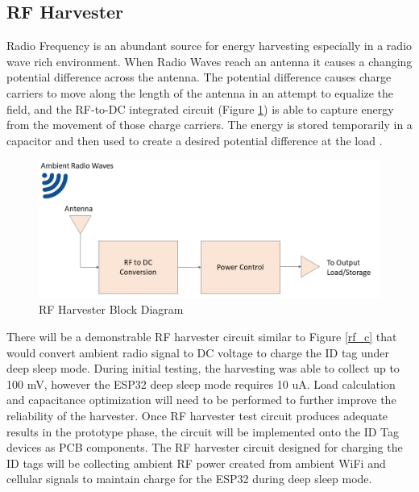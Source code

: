 \pagebreak
\subsection{RF Harvester}
\medskip
Radio Frequency is an abundant source for energy harvesting especially in a radio wave rich environment. When Radio Waves reach an antenna it causes a changing potential difference across the antenna. The potential difference causes charge carriers to move along the length of the antenna in an attempt to equalize the field, and the RF-to-DC integrated circuit (Figure \ref{rf_bd}) is able to capture energy from the movement of those charge carriers. The energy is stored temporarily in a capacitor and then used to create a desired potential difference at the load \cite{R5-2-1}.

\medskip
\begin{figure}[H]
\centering
    \includegraphics[scale=0.55]{./images/RF_H.png}
    \caption{RF Harvester Block Diagram}
    \label{rf_bd}
\end{figure}

There will be a demonstrable RF harvester circuit similar to Figure \ref{rf_c} that would convert ambient radio signal to DC voltage to charge the ID tag under deep sleep mode. During initial testing, the harvesting was able to collect up to 100 mV, however the ESP32 deep sleep mode requires 10 uA. Load calculation and capacitance optimization will need to be performed to further improve the reliability of the harvester. Once RF harvester test circuit produces adequate results in the prototype phase, the circuit will be implemented onto the ID Tag devices as PCB components. The RF harvester circuit designed for charging the ID tags will be collecting ambient RF power created from ambient WiFi and cellular signals to maintain charge for the ESP32 during deep sleep mode.

